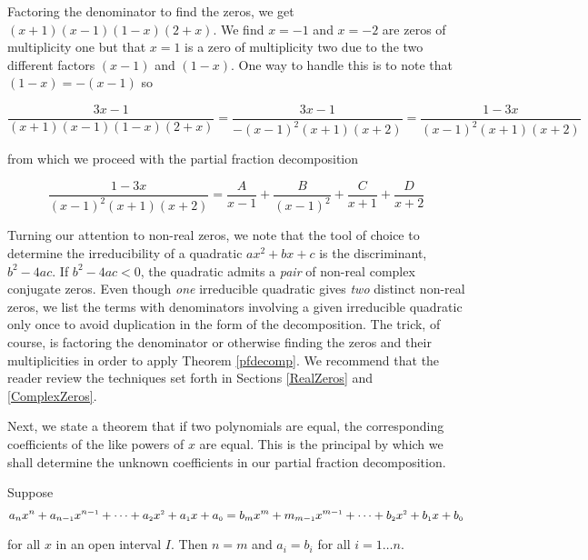 Factoring the denominator to find the zeros, we get $(x+1)(x-1)(1-x)(2+x)$.  We find $x = -1$ and $x=-2$ are zeros of multiplicity one but that $x=1$ is a zero of multiplicity two due to the two different factors $(x-1)$ and $(1-x)$.  One way to handle this is to note that $(1-x) = -(x-1)$ so 

\[\dfrac{3x-1}{(x+1)(x-1)(1-x)(2+x)} = \dfrac{3x-1}{-(x-1)^2(x+1)(x+2)} = \dfrac{1-3x}{(x-1)^2(x+1)(x+2)}\]

from which we proceed with the partial fraction decomposition

\[\dfrac{1-3x}{(x-1)^2(x+1)(x+2)} = \dfrac{A}{x-1} + \dfrac{B}{(x-1)^2} + \dfrac{C}{x+1} + \dfrac{D}{x+2}\]

Turning our attention to non-real zeros, we note that the tool of choice to determine the irreducibility of a quadratic  $ax^2+bx+c$ is the discriminant, $b^2-4ac$.  If $b^2 - 4ac < 0$, the quadratic admits a \textit{pair} of non-real complex conjugate zeros.  Even though \textit{one} irreducible quadratic gives \textit{two} distinct non-real zeros, we list the terms with denominators involving a given irreducible quadratic only once to avoid duplication in the form of the decomposition.  The trick, of course, is factoring the denominator or otherwise finding the zeros and their multiplicities in order to apply Theorem \ref{pfdecomp}.  We recommend that the reader review the techniques set forth in Sections \ref{RealZeros} and \ref{ComplexZeros}. 

Next, we state a theorem that if two polynomials are equal, the corresponding coefficients of the like powers of $x$ are equal.  This is the principal by which we shall determine the unknown coefficients in our partial fraction decomposition.

\smallskip

\colorbox{ResultColor}{\bbm

\begin{thm}  \label{polyequality} Suppose \[a_{n} x^{n} + a_{n-\mbox{\tiny$1$}} x^{n-\mbox{\tiny$1$}} + \cdots + a_{\mbox{\tiny $2$}} x^{\mbox{\tiny $2$}} + a_{\mbox{\tiny $1$}} x + a_{\mbox{\tiny $0$}} = b_{m} x^{m} + m_{m-\mbox{\tiny$1$}} x^{m-\mbox{\tiny$1$}} + \cdots + b_{\mbox{\tiny $2$}} x^{\mbox{\tiny $2$}} + b_{\mbox{\tiny $1$}} x + b_{\mbox{\tiny $0$}}\]

for all $x$ in an open interval $I$.  Then $n=m$ and $a_{i} = b_{i}$ for all $i = 1 \ldots n$.


\end{thm}

\ebm}



